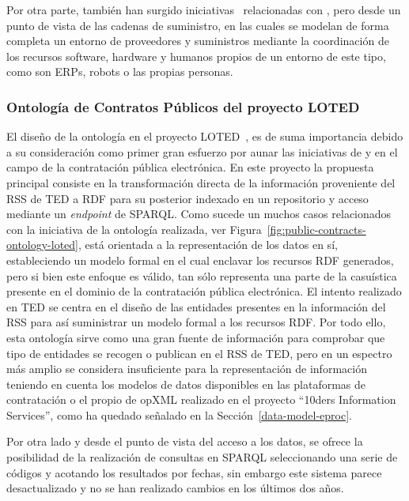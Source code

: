 Por otra parte, también han surgido iniciativas~\cite{DBLP:journals/tcci/Alor-HernandezAJPRMBG10} relacionadas con \eproc, pero desde un punto de vista
de las cadenas de suministro, en las cuales se modelan de forma completa un entorno de proveedores y suministros mediante la coordinación
de los recursos software, hardware y humanos propios de un entorno de este tipo, como son \gls{ERP}s, robots o las propias personas. 

\subsubsection{Ontología de Contratos Públicos del proyecto LOTED}
El diseño de la ontología en el proyecto LOTED~\cite{loted-project}, es de suma importancia debido a su consideración 
como primer gran esfuerzo por aunar las iniciativas de \linkeddata y \opendata en el campo de la contratación 
pública electrónica. En este proyecto la propuesta principal consiste en la transformación directa 
de la información proveniente del \gls{RSS} de \gls{TED} a \gls{RDF} para su posterior indexado en un repositorio y acceso 
mediante un \textit{endpoint} de \gls{SPARQL}. Como sucede un muchos casos relacionados con la iniciativa 
de \linkeddata la ontología realizada, ver Figura~\ref{fig:public-contracts-ontology-loted}, está orientada a la representación de los datos en sí, estableciendo 
un modelo formal en el cual enclavar los recursos RDF generados, pero si bien este enfoque es válido, tan sólo 
representa una parte de la casuística presente en el dominio de la contratación pública electrónica. El intento 
realizado en TED se centra en el diseño de las entidades presentes en la información del RSS para así suministrar 
un modelo formal a los recursos RDF. Por todo ello, esta ontología sirve como una gran fuente de información 
para comprobar que tipo de entidades se recogen o publican en el RSS de TED, pero en un espectro más amplio 
se considera insuficiente para la representación de información teniendo en cuenta los modelos de datos 
disponibles en las plataformas de contratación o el propio de \gls{opXML} realizado en el proyecto ``10ders Information 
Services'', como ha quedado señalado en la Sección~\ref{data-model-eproc}. 

Por otra lado y desde el punto de vista del acceso a los datos, se ofrece la posibilidad de la realización 
de consultas en SPARQL seleccionando una serie de códigos y acotando los resultados por fechas, sin embargo este sistema 
parece desactualizado y no se han realizado cambios en los últimos dos años. 

